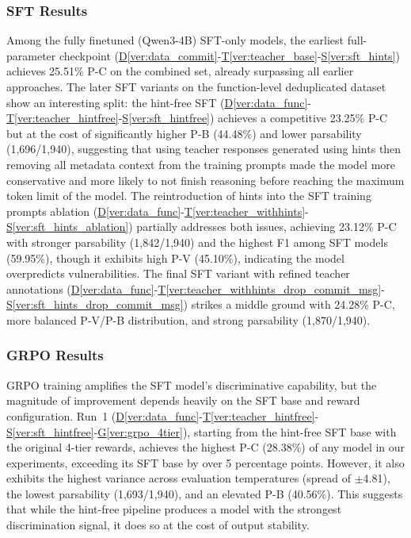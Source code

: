 \documentclass[12pt,a4paper]{article}
\newcommand{\vcode}[4]{\hyperref[#1]{D\ref*{#1}}-\hyperref[#2]{T\ref*{#2}}-\hyperref[#3]{S\ref*{#3}}-\hyperref[#4]{G\ref*{#4}}}
\newcommand{\vcodeSFT}[3]{\hyperref[#1]{D\ref*{#1}}-\hyperref[#2]{T\ref*{#2}}-\hyperref[#3]{S\ref*{#3}}}
\begin{document}
\subsubsection{SFT Results}

Among the fully finetuned (Qwen3-4B) SFT-only models, the earliest full-parameter checkpoint (\vcodeSFT{ver:data_commit}{ver:teacher_base}{ver:sft_hints}) achieves 25.51\% P-C on the combined set, already surpassing all earlier approaches. The later SFT variants on the function-level deduplicated dataset show an interesting split: the hint-free SFT (\vcodeSFT{ver:data_func}{ver:teacher_hintfree}{ver:sft_hintfree}) achieves a competitive 23.25\% P-C but at the cost of significantly higher P-B (44.48\%) and lower parsability (1,696/1,940), suggesting that using teacher responses generated using hints then removing all metadata context from the training prompts made the model more conservative and more likely to not finish reasoning before reaching the maximum token limit of the model. The reintroduction of hints into the SFT training prompts ablation (\vcodeSFT{ver:data_func}{ver:teacher_withhints}{ver:sft_hints_ablation}) partially addresses both issues, achieving 23.12\% P-C with stronger parsability (1,842/1,940) and the highest F1 among SFT models (59.95\%), though it exhibits high P-V (45.10\%), indicating the model overpredicts vulnerabilities. The final SFT variant with refined teacher annotations (\vcodeSFT{ver:data_func}{ver:teacher_withhints_drop_commit_msg}{ver:sft_hints_drop_commit_msg}) strikes a middle ground with 24.28\% P-C, more balanced P-V/P-B distribution, and strong parsability (1,870/1,940).

\subsubsection{GRPO Results}

GRPO training amplifies the SFT model's discriminative capability, but the magnitude of improvement depends heavily on the SFT base and reward configuration. Run~1 (\vcode{ver:data_func}{ver:teacher_hintfree}{ver:sft_hintfree}{ver:grpo_4tier}), starting from the hint-free SFT base with the original 4-tier rewards, achieves the highest P-C (28.38\%) of any model in our experiments, exceeding its SFT base by over 5 percentage points. However, it also exhibits the highest variance across evaluation temperatures (spread of $\pm$4.81), the lowest parsability (1,693/1,940), and an elevated P-B (40.56\%). This suggests that while the hint-free pipeline produces a model with the strongest discrimination signal, it does so at the cost of output stability.
\end{document}
